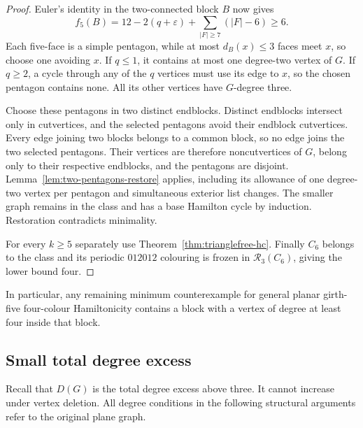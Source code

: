 \documentclass[11pt]{article}
\theoremstyle{remark}
\newcommand{\R}{\mathcal R}
\numberwithin{equation}{section}
\numberwithin{table}{section}
\begin{document}
\begin{proof}
Euler's identity in the two-connected block $B$ now gives
\[
 f_5(B)=12-2(q+\varepsilon)+\sum_{|F|\ge7}(|F|-6)\ge6.
\]
Each five-face is a simple pentagon, while at most $d_B(x)\le3$
faces meet $x$, so choose one avoiding $x$. If $q\le1$, it contains
at most one degree-two vertex of $G$. If $q\ge2$, a cycle through
any of the $q$ vertices must use its edge to $x$, so the chosen
pentagon contains none. All its other vertices have $G$-degree three.

Choose these pentagons in two distinct endblocks. Distinct endblocks
intersect only in cutvertices, and the selected pentagons avoid their
endblock cutvertices. Every edge joining two blocks belongs to a common
block, so no edge joins the two selected pentagons. Their vertices are
therefore noncutvertices of $G$, belong only to their respective
endblocks, and the pentagons are disjoint.
Lemma~\ref{lem:two-pentagons-restore}
applies, including its allowance of one degree-two vertex per
pentagon and simultaneous exterior list changes. The smaller graph
remains in the class and has a base Hamilton cycle by induction.
Restoration contradicts minimality.

For every $k\ge5$ separately use Theorem~\ref{thm:trianglefree-hc}.
Finally $C_6$ belongs to the class and its periodic
$012012$ colouring is frozen in $\R_3(C_6)$, giving the lower bound
four.
\end{proof}
In particular, any remaining minimum counterexample for general planar
girth-five four-colour Hamiltonicity contains a block with a vertex of
degree at least four inside that block.


\subsection{Small total degree excess}
Recall that $D(G)$ is the total degree excess above three.
It cannot increase under vertex deletion. All degree conditions
in the following structural arguments refer to the original plane graph.
\end{document}
